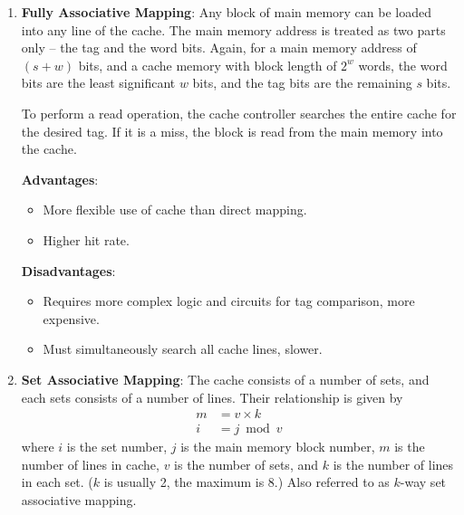 \begin{enumerate}
    \begin{multicols}{2}
        \textbf{Advantages}: \begin{itemize}
            \item Only need to check one cache line, fast.
            \item No selection is required, less use of logic gates, inexpensive.
        \end{itemize}
        \columnbreak
        \textbf{Disadvantages}: \begin{itemize}
            \item When two blocks map to the same line are accessed alternatively,
                constant cache misses occur.
            \item The cache is not fully utilised.
        \end{itemize}
    \end{multicols}

\item \textbf{Fully Associative Mapping}:
    Any block of main memory can be loaded into any line of the cache. The main memory
    address is treated as two parts only -- the tag and the word bits. Again, for a main
    memory address of $(s+w)$ bits, and a cache memory with block length of $2^w$ words,
    the word bits are the least significant $w$ bits, and the tag bits are the remaining
    $s$ bits.

    To perform a read operation, the cache controller searches the entire cache for the
    desired tag. If it is a miss, the block is read from the main memory into the cache.

    \begin{multicols}{2}
        \textbf{Advantages}: \begin{itemize}
            \item More flexible use of cache than direct mapping.
            \item Higher hit rate.
        \end{itemize}
        \columnbreak
        \textbf{Disadvantages}: \begin{itemize}
            \item Requires more complex logic and circuits for tag comparison, more expensive.
            \item Must simultaneously search all cache lines, slower.
        \end{itemize}
    \end{multicols}

\item \textbf{Set Associative Mapping}:
    The cache consists of a number of sets, and each sets consists of a number of lines.
    Their relationship is given by
    \begin{align*}
        m &= v \times k \\
        i &= j \bmod v
    \end{align*}
    where $i$ is the set number, $j$ is the main memory block number, $m$ is the number
    of lines in cache, $v$ is the number of sets, and $k$ is the number of lines in each set.
    ($k$ is usually 2, the maximum is 8.) Also referred to as $k$-way set associative mapping.


\end{enumerate}

